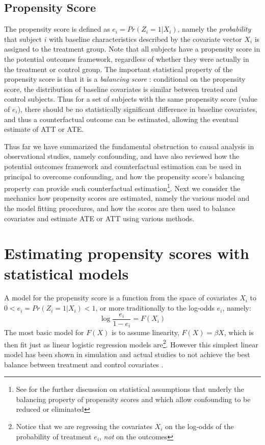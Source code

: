 \documentclass[11pt]{scrartcl}
\begin{document}
\subsection*{Propensity Score}
The propensity score is defined as $e_i=Pr(Z_i=1|X_i)$, namely the \emph{probability} that subject $i$ with baseline characteristics described by the covariate vector $X_i$ is assigned to the treatment group.  Note that all subjects have a propensity score in the potential outcomes framework, regardless of whether they were actually in the treatment or control group.  The important statistical property of the propensity score is that it is a \emph{balancing score} \cite{austin2011introduction}: conditional on the propensity score, the distribution of baseline covariates is similar between treated and control subjects.  Thus for a set of subjects with the same propensity score (value of $e_i$), there should be no statistically significant difference in baseline covariates, and thus a counterfactual outcome can be estimated, allowing the eventual estimate of ATT or ATE.  

Thus far we have summarized the fundamental obstruction to causal analysis in observational studies, namely confounding, and have also reviewed how the potential outcomes framework and counterfactual estimation can be used in principal to overcome confounding, and how the propensity score's balancing property can provide such counterfactual estimation\footnote{See \cite{austin2011introduction} for the further discussion on statistical assumptions that underly the balancing property of propensity scores and which allow confounding to be reduced or eliminated}.  Next we consider the mechanics how propensity scores are estimated, namely the various model and the model fitting procedures, and how the scores are then used to balance covariates and estimate ATE or ATT using various methods.  

\section*{Estimating propensity scores with statistical models}
A model for the propensity score is a function from the space of covariates $X_i$ to $0<e_i=Pr(Z_i=1|X_i)<1$, or more traditionally to the log-odds $e_i$, namely:  
\begin{equation}
\log\frac{e_i}{1-e_i}=F(X_i)
\end{equation}
The most basic model for $F(X)$ is to assume linearity, $F(X)=\beta X$, which is then fit just as linear logistic regression models are\footnote{Notice that we are regressing the covariates $X_i$ on the log-odds of the probability of treatment $e_i$, \emph{not} on the outcomes}. However this simplest linear model has been shown in simulation and actual studies to not achieve the best balance between treatment and control covariates .  
\end{document}
